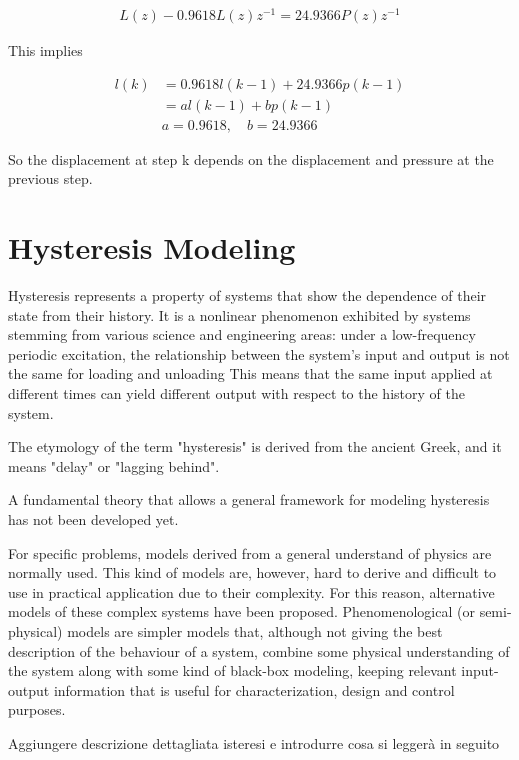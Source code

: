 \begin{align}
L(z) - 0.9618 L(z)z^{-1}  = 24.9366 P(z) z^{-1}
\label{eq:l_k_1}
\end{align}

This implies

\begin{align}
l(k) &= 0.9618 l(k-1) + 24.9366p(k-1) \nonumber \\
&= a l(k-1) + b p(k-1) \label{eq:l_k_2}\\
&a = 0.9618, \quad b = 24.9366 \nonumber
\end{align}

So the displacement at step k depends on the displacement and pressure
at the previous step.

\section{Hysteresis Modeling}

Hysteresis represents a property of systems that show
the dependence of their state from their history.
It is a nonlinear phenomenon exhibited by systems stemming
from various science and engineering areas: under a low-frequency
periodic excitation, the relationship between the system’s input and
output is not the same for loading and unloading
This means that the same input applied at different times can yield
different output with respect to the history of the system.

The etymology of the term "hysteresis" is derived from the ancient Greek,
and it means "delay" or "lagging behind".

A fundamental theory that allows a general framework
for modeling hysteresis has not been developed yet.

For specific problems, models derived from a general understand of physics
are normally used. This kind of models are, however, hard to derive and
difficult to use in practical application due to their complexity.
For this reason, alternative models of these complex systems have been proposed.
Phenomenological (or semi-physical) models are simpler models that,
although not giving the best description of the behaviour of a system,
combine some physical understanding of the system along with
some kind of black-box modeling, keeping relevant
input-output information that is useful for characterization,
design and control purposes.

{\color{red}Aggiungere descrizione dettagliata isteresi e introdurre cosa si leggerà in seguito}

